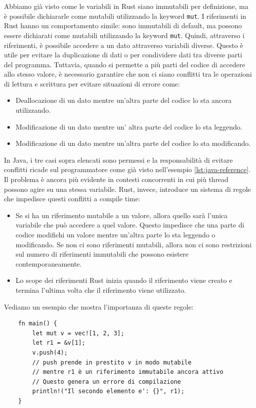 Abbiamo già visto come le variabili in Rust siano immutabili per definizione, ma è possibile dichiararle come mutabili utilizzando la keyword \texttt{mut}. I riferimenti in Rust hanno un comportamento simile: sono immutabili di default, ma possono essere dichiarati come mutabili utilizzando la keyword \texttt{mut}. Quindi, attraverso i riferimenti, è possibile accedere a un dato attraverso variabili diverse. Questo è utile per evitare la duplicazione di dati o per condividere dati tra diverse parti del programma. Tuttavia, quando si permette a più parti del codice di accedere allo stesso valore, è necessario garantire che non ci siano conflitti tra le operazioni di lettura e scrittura per evitare situazioni di errore come:
\begin{itemize}
    \item Deallocazione di un dato mentre un'altra parte del codice lo sta ancora utilizzando.
    \item Modificazione di un dato mentre un' altra parte del codice lo sta leggendo.
    \item Modificazione di un dato mentre un'altra parte del codice lo sta modificando.
\end{itemize} 
In Java, i tre casi sopra elencati sono permessi e la responsabilità di evitare conflitti ricade sul programmatore come già visto nell'esempio \ref{lst:java-reference}. Il problema è ancora più evidente in contesti concorrenti in cui più thread possono agire su una stessa variabile. Rust, invece, introduce un sistema di regole che impedisce questi conflitti a compile time:
\begin{itemize}
    \item Se si ha un riferimento mutabile a un valore, allora quello sarà l'unica variabile che può accedere a quel valore. Questo impedisce che una parte di codice modifichi un valore mentre un'altra parte lo sta leggendo o modificando. Se non ci sono riferimenti mutabili, allora non ci sono restrizioni sul numero di riferimenti immutabili che possono esistere contemporaneamente. 
    \item Lo scope dei riferimenti Rust inizia quando il riferimento viene creato e termina l'ultima volta che il riferimento viene utilizzato. 
\end{itemize}
Vediamo un esempio che mostra l'importanza di queste regole:
\begin{verbatim}
    fn main() {
        let mut v = vec![1, 2, 3];
        let r1 = &v[1];
        v.push(4);
        // push prende in prestito v in modo mutabile
        // mentre r1 è un riferimento immutabile ancora attivo
        // Questo genera un errore di compilazione
        println!("Il secondo elemento e': {}", r1);
    } 
\end{verbatim}
